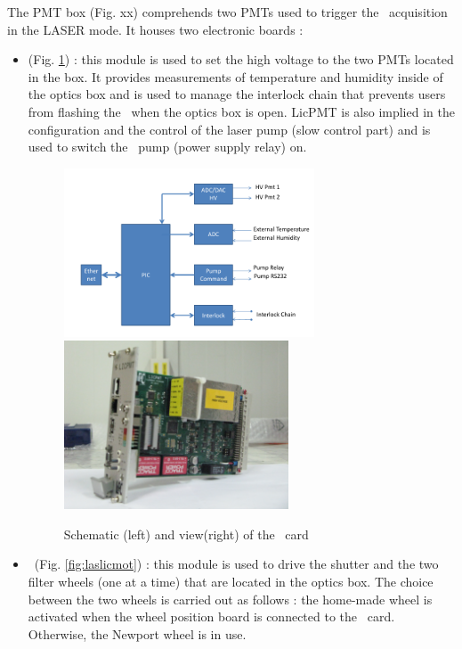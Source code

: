 The PMT box (Fig. xx) comprehends two PMTs used to trigger the \laserii~acquisition in the LASER mode. It houses two electronic boards :
\begin{itemize}

\item \licpmt (Fig. \ref{fig:laslicpmt}) : this module is used to set the high voltage to the two PMTs located in the box. It provides measurements of temperature and humidity inside of the optics box and is used to manage the interlock chain that prevents users from flashing the \laser~when the optics box is open. LicPMT is also implied in the configuration and the control of the laser pump (slow control part) and is used to switch the \laser~pump (power supply relay) on. 

\begin{figure}[htbp]
\centering
\includegraphics[height=5cm]{figures/licpmt_scheme.pdf}
\includegraphics[height=5cm]{figures/licpmt.JPG}
\caption{Schematic (left) and view(right) of the \licpmt~card}\label{fig:laslicpmt}
\end{figure}

\item \licmot~(Fig. \ref{fig:laslicmot}) : this module is used to drive the shutter and the two filter wheels (one at a time) that are located in the optics box. The choice between the two wheels is carried out as follows : the home-made wheel is activated when the wheel position board is connected to the \licmot~card. Otherwise, the Newport wheel is in use.


\end{itemize}
